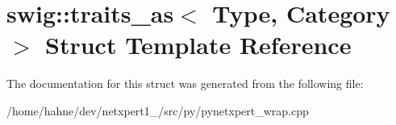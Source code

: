 \hypertarget{structswig_1_1traits__as}{}\section{swig\+:\+:traits\+\_\+as$<$ Type, Category $>$ Struct Template Reference}
\label{structswig_1_1traits__as}


The documentation for this struct was generated from the following file\+:\begin{DoxyCompactItemize}
\item 
/home/hahne/dev/netxpert1\+\_/src/py/pynetxpert\+\_\+wrap.\+cpp\end{DoxyCompactItemize}
